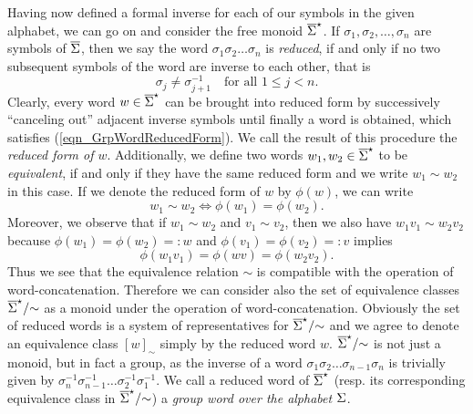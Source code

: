 Having now defined a formal inverse for each of our symbols in the given alphabet, we can go on and consider the free monoid ${\overline{\Sigma}}^{\star}$. If $\sigma_1, \sigma_2, \dots, \sigma_n$ are symbols of $\overline{\Sigma}$, then we say the word $\sigma_1 \sigma_2 \dots \sigma_n$ is \emph{reduced}, if and only if no two subsequent symbols of the word are inverse to each other, that is
\begin{equation}
\label{eqn_GrpWordReducedForm}
 \sigma_j \ne \sigma_{j+1}^{-1} \quad \text{for all } 1 \le j < n.
\end{equation}
Clearly, every word $w \in {\overline{\Sigma}}^{\star}$ can be brought into reduced form by successively ``canceling out'' adjacent inverse symbols until finally a word is obtained, which satisfies (\ref{eqn_GrpWordReducedForm}). We call the result of this procedure the \emph{reduced form of $w$}. Additionally, we define two words $w_1, w_2 \in {\overline{\Sigma}}^{\star}$ to be \emph{equivalent}, if and only if they have the same reduced form and we write $w_1 \sim w_2$ in this case. If we denote the reduced form of $w$ by $\phi(w)$, we can write
\begin{equation*}
w_1 \sim w_2 \Leftrightarrow \phi(w_1) = \phi(w_2).
\end{equation*}
Moreover, we observe that if $w_1 \sim w_2$ and $v_1 \sim v_2$, then we also have $w_1 v_1 \sim w_2 v_2$ because $\phi(w_1) = \phi(w_2) =: w$ and $\phi(v_1) = \phi(v_2) =: v$ implies 
\begin{equation*}
\phi(w_1 v_1) = \phi(w v) = \phi(w_2 v_2).
\end{equation*}
Thus we see that the equivalence relation $\sim$ is compatible with the operation of word-concatenation. Therefore we can consider also the set of equivalence classes ${\overline{\Sigma}}^{\star}/{\sim}$ as a monoid under the operation of word-concatenation. Obviously the set of reduced words is a system of representatives for ${\overline{\Sigma}}^{\star}/{\sim}$ and we agree to denote an equivalence class $[w]_{\sim}$ simply by the reduced word $w$. ${\overline{\Sigma}}^{\star}/{\sim}$ is not just a monoid, but in fact a group, as the inverse of a word $\sigma_1 \sigma_2 \dots \sigma_{n-1} \sigma_n$ is trivially given by $\sigma_n^{-1} \sigma_{n-1}^{-1} \dots \sigma_2^{-1} \sigma_1^{-1}$. We call a reduced word of ${\overline{\Sigma}}^{\star}$ (resp. its corresponding equivalence class in ${\overline{\Sigma}}^{\star}/{\sim}$) a \emph{group word over the alphabet $\Sigma$}.

